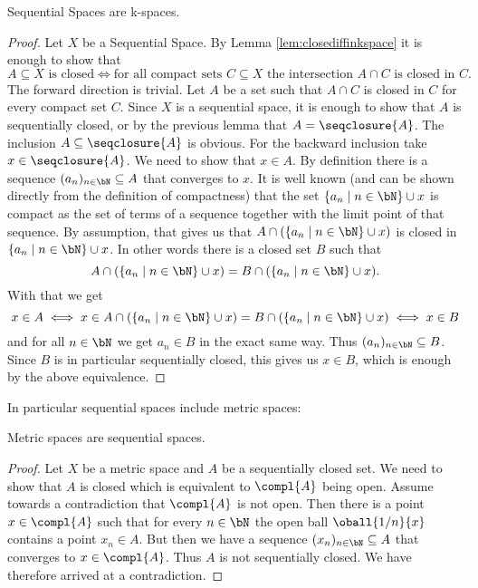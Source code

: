 \begin{lem} \label{lem:sequentialiskspace}
    Sequential Spaces are k-spaces. 
    \href{https://github.com/scholzhannah/CWComplexes/blob/7be4872a05b534011cc969eb5b80a4b7f0bf57e2/CWcomplexes/KSpace.lean#L88-L114}{\faExternalLink}
\end{lem}
\begin{proof}
    Let $X$ be a Sequential Space. 
    By Lemma \ref{lem:closediffinkspace} it is enough to show that 
    \[A \subseteq X \text{ is closed} \iff \text{for all compact sets } C \subseteq X \text{ the intersection } A \cap C \text{ is closed in } C.\]
    The forward direction is trivial.
    Let $A$ be a set such that $A \cap C$ is closed in $C$ for every compact set $C$. 
    Since $X$ is a sequential space, it is enough to show that $A$ is sequentially closed, or by the previous lemma that $A  = \seqclosure{A}$.
    The inclusion $A \subseteq \seqclosure{A}$ is obvious. 
    For the backward inclusion take $x \in \seqclosure{A}$. 
    We need to show that $x \in A$.
    By definition there is a sequence $(a_n)_{n \in \bN} \subseteq A$ that converges to $x$. 
    It is well known (and can be shown directly from the definition of compactness) that the set $\{a_n \mid n \in \bN\} \cup {x}$ is compact as the set of terms of a sequence together with the limit point of that sequence.
    \href{https://github.com/leanprover-community/mathlib4/blob/93828f4cd10fb8cab31700b110fd2751d36bf1b8/Mathlib/Topology/Compactness/Compact.lean#L620-L622}{\faExternalLink}
    By assumption, that gives us that $A \cap (\{a_n \mid n \in \bN\} \cup {x})$ is closed in $\{a_n \mid n \in \bN\} \cup {x}$. 
    In other words there is a closed set $B$ such that 
    \[A \cap (\{a_n \mid n \in \bN\} \cup {x}) = B \cap (\{a_n \mid n \in \bN\} \cup {x}).\]
    With that we get
    \[x \in A \iff x \in A \cap (\{a_n \mid n \in \bN\} \cup {x}) = B \cap (\{a_n \mid n \in \bN\} \cup {x}) \iff x \in B\]
    and for all $n \in \bN$ we get $a_n \in B$ in the exact same way. 
    Thus $(a_n)_{n \in \bN} \subseteq B$.
    Since $B$ is in particular sequentially closed, this gives us $x \in B$, which is enough by the above equivalence.
\end{proof}

In particular sequential spaces include metric spaces: 

\begin{lem}\label{lem:metricissequential}
    Metric spaces are sequential spaces.
\end{lem}
\begin{proof}
    Let $X$ be a metric space and $A$ be a sequentially closed set. 
    We need to show that $A$ is closed which is equivalent to $\compl{A}$ being open.
    Assume towards a contradiction that $\compl{A}$ is not open. 
    Then there is a point $x \in \compl{A}$ such that for every $n \in \bN$ the open ball $\oball{1/n}{x}$ contains a point $x_n \in A$. 
    But then we have a sequence $(x_n)_{n \in \bN} \subseteq A$ that converges to $x \in \compl{A}$. Thus $A$ is not sequentially closed. 
    We have therefore arrived at a contradiction. 
\end{proof}

